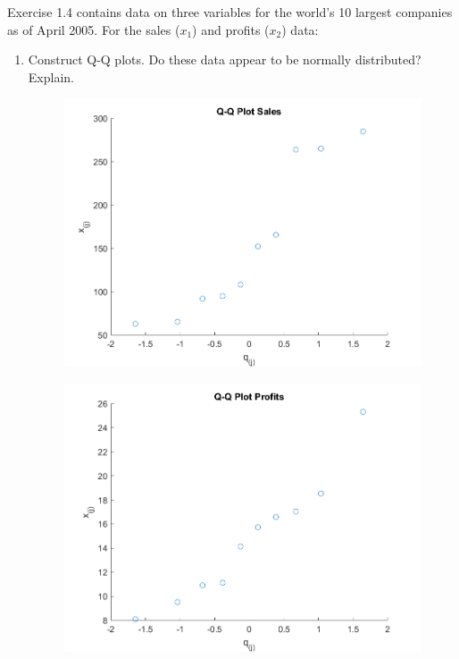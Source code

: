 Exercise 1.4 contains data on three variables for the world's 10 largest companies as of
April 2005. For the sales ($x_{1}$) and profits ($x_{2}$) data:
\begin{enumerate}[label= (\alph*)]
    \item Construct Q-Q plots. Do these data appear to be normally distributed? Explain.
    \begin{figure}[H]
        \includegraphics[scale=0.8]{./matlab/chapter-4/sol4.24a_sales.png}
    \end{figure}
    \begin{figure}[H]
        \includegraphics[scale=0.8]{./matlab/chapter-4/sol4.24a_profits.png}
    \end{figure}

\end{enumerate}
